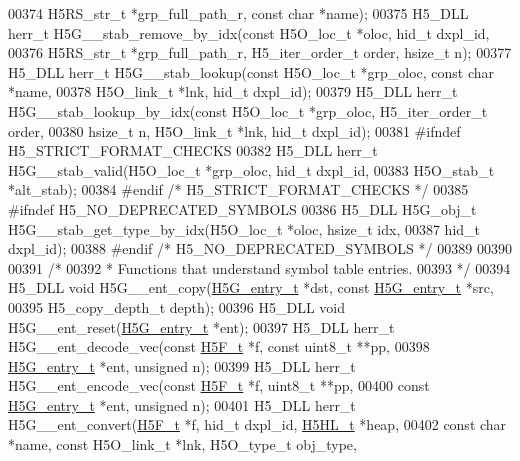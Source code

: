 \begin{DoxyCode}
00374     H5RS\_str\_t *grp\_full\_path\_r, \textcolor{keyword}{const} \textcolor{keywordtype}{char} *name);
00375 H5\_DLL herr\_t H5G\_\_stab\_remove\_by\_idx(\textcolor{keyword}{const} H5O\_loc\_t *oloc, hid\_t dxpl\_id,
00376     H5RS\_str\_t *grp\_full\_path\_r, H5\_iter\_order\_t order, hsize\_t n);
00377 H5\_DLL herr\_t H5G\_\_stab\_lookup(\textcolor{keyword}{const} H5O\_loc\_t *grp\_oloc, \textcolor{keyword}{const} \textcolor{keywordtype}{char} *name,
00378     H5O\_link\_t *lnk, hid\_t dxpl\_id);
00379 H5\_DLL herr\_t H5G\_\_stab\_lookup\_by\_idx(\textcolor{keyword}{const} H5O\_loc\_t *grp\_oloc, H5\_iter\_order\_t order,
00380     hsize\_t n, H5O\_link\_t *lnk, hid\_t dxpl\_id);
00381 \textcolor{preprocessor}{#ifndef H5\_STRICT\_FORMAT\_CHECKS}
00382 H5\_DLL herr\_t H5G\_\_stab\_valid(H5O\_loc\_t *grp\_oloc, hid\_t dxpl\_id,
00383     H5O\_stab\_t *alt\_stab);
00384 \textcolor{preprocessor}{#endif }\textcolor{comment}{/* H5\_STRICT\_FORMAT\_CHECKS */}\textcolor{preprocessor}{}
00385 \textcolor{preprocessor}{#ifndef H5\_NO\_DEPRECATED\_SYMBOLS}
00386 H5\_DLL H5G\_obj\_t H5G\_\_stab\_get\_type\_by\_idx(H5O\_loc\_t *oloc, hsize\_t idx,
00387     hid\_t dxpl\_id);
00388 \textcolor{preprocessor}{#endif }\textcolor{comment}{/* H5\_NO\_DEPRECATED\_SYMBOLS */}\textcolor{preprocessor}{}
00389 
00390 
00391 \textcolor{comment}{/*}
00392 \textcolor{comment}{ * Functions that understand symbol table entries.}
00393 \textcolor{comment}{ */}
00394 H5\_DLL \textcolor{keywordtype}{void} H5G\_\_ent\_copy(\hyperlink{struct_h5_g__entry__t}{H5G\_entry\_t} *dst, \textcolor{keyword}{const} \hyperlink{struct_h5_g__entry__t}{H5G\_entry\_t} *src,
00395             H5\_copy\_depth\_t depth);
00396 H5\_DLL \textcolor{keywordtype}{void} H5G\_\_ent\_reset(\hyperlink{struct_h5_g__entry__t}{H5G\_entry\_t} *ent);
00397 H5\_DLL herr\_t H5G\_\_ent\_decode\_vec(\textcolor{keyword}{const} \hyperlink{struct_h5_f__t}{H5F\_t} *f, \textcolor{keyword}{const} uint8\_t **pp,
00398                   \hyperlink{struct_h5_g__entry__t}{H5G\_entry\_t} *ent, \textcolor{keywordtype}{unsigned} n);
00399 H5\_DLL herr\_t H5G\_\_ent\_encode\_vec(\textcolor{keyword}{const} \hyperlink{struct_h5_f__t}{H5F\_t} *f, uint8\_t **pp,
00400                   \textcolor{keyword}{const} \hyperlink{struct_h5_g__entry__t}{H5G\_entry\_t} *ent, \textcolor{keywordtype}{unsigned} n);
00401 H5\_DLL herr\_t H5G\_\_ent\_convert(\hyperlink{struct_h5_f__t}{H5F\_t} *f, hid\_t dxpl\_id, \hyperlink{struct_h5_h_l__t}{H5HL\_t} *heap,
00402     \textcolor{keyword}{const} \textcolor{keywordtype}{char} *name, \textcolor{keyword}{const} H5O\_link\_t *lnk, H5O\_type\_t obj\_type,

\end{DoxyCode}
